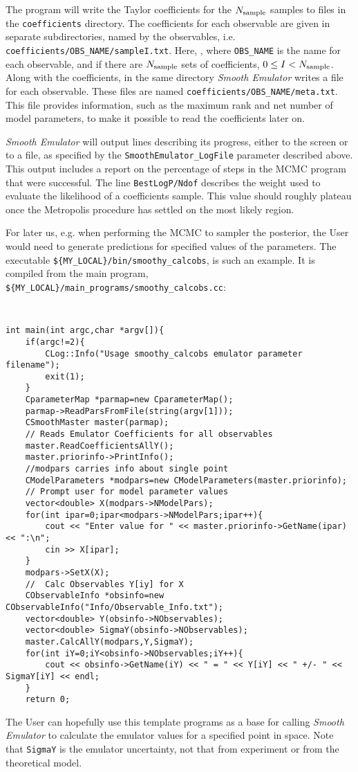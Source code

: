 \documentclass[UserManual.tex]{subfiles}
\begin{document}
The program will write the Taylor coefficients for the $N_{\rm sample}$ samples to files in the {\tt coefficients} directory.  The coefficients for each observable are given in separate subdirectories, named by the observables, i.e. {\tt coefficients/OBS\_NAME/sampleI.txt}. Here, , where {\tt OBS\_NAME} is the name for each observable, and if there are $N_{\rm sample}$ sets of coefficients, $0\le I<N_{\rm sample}$. Along with the coefficients, in the same directory {\it Smooth Emulator} writes a file for each observable. These files are named {\tt coefficients/OBS\_NAME/meta.txt}.  This file provides information, such as the maximum rank and net number of model parameters, to make it possible to read the coefficients later on.

{\it Smooth Emulator} will output lines describing its progress, either to the screen or to a file, as specified by the {\tt SmoothEmulator\_LogFile} parameter described above. This output includes a report on the percentage of steps in the MCMC program that were successful. The line {\tt BestLogP/Ndof} describes the weight used to evaluate the likelihood of a coefficients sample. This value should roughly plateau once the Metropolis procedure has settled on the most likely region.

For later us, e.g. when performing the MCMC to sampler the posterior, the User would need to generate predictions for specified values of the parameters. The executable {\tt \$\{MY\_LOCAL\}/bin/smoothy\_calcobs}, is such an example. It is compiled from the main program, {\tt \$\{MY\_LOCAL\}/main\_programs/smoothy\_calcobs.cc}:
{\tt
\begin{verbatim}
int main(int argc,char *argv[]){
    if(argc!=2){
        CLog::Info("Usage smoothy_calcobs emulator parameter filename");
        exit(1);
    }
    CparameterMap *parmap=new CparameterMap();
    parmap->ReadParsFromFile(string(argv[1]));
    CSmoothMaster master(parmap);
    // Reads Emulator Coefficients for all observables
    master.ReadCoefficientsAllY();
    master.priorinfo->PrintInfo();
    //modpars carries info about single point
    CModelParameters *modpars=new CModelParameters(master.priorinfo);
    // Prompt user for model parameter values
    vector<double> X(modpars->NModelPars);
    for(int ipar=0;ipar<modpars->NModelPars;ipar++){
        cout << "Enter value for " << master.priorinfo->GetName(ipar) << ":\n";
        cin >> X[ipar];
    }
    modpars->SetX(X);
    //  Calc Observables Y[iy] for X
    CObservableInfo *obsinfo=new CObservableInfo("Info/Observable_Info.txt");
    vector<double> Y(obsinfo->NObservables);
    vector<double> SigmaY(obsinfo->NObservables);
    master.CalcAllY(modpars,Y,SigmaY);
    for(int iY=0;iY<obsinfo->NObservables;iY++){
        cout << obsinfo->GetName(iY) << " = " << Y[iY] << " +/- " << SigmaY[iY] << endl;
    }
    return 0;

\end{verbatim}
}
The User can hopefully use this template programs as a base for calling {\it Smooth Emulator} to calculate the emulator values for a specified point in space. Note that {\tt SigmaY} is the emulator uncertainty, not that from experiment or from the theoretical model.
\end{document}
